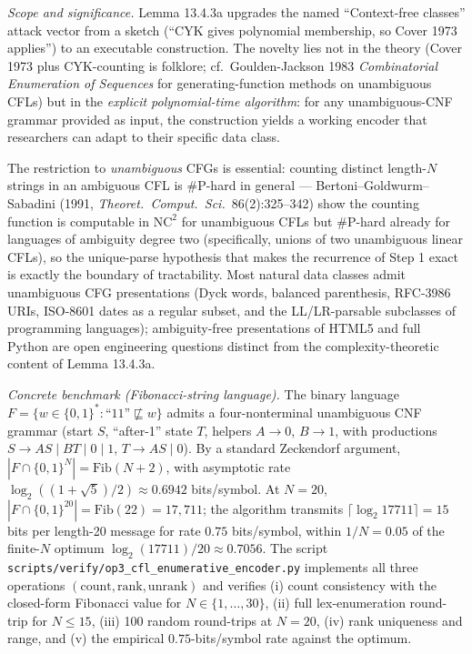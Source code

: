 \documentclass[
]{article}
\begin{document}
\emph{Scope and significance.} Lemma 13.4.3a upgrades the named
``Context-free classes'' attack vector from a sketch (``CYK gives
polynomial membership, so Cover 1973 applies'') to an executable
construction. The novelty lies not in the theory (Cover 1973 plus
CYK-counting is folklore; cf.\ Goulden-Jackson 1983 \emph{Combinatorial
Enumeration of Sequences} for generating-function methods on
unambiguous CFLs) but in the \emph{explicit polynomial-time algorithm}:
for any unambiguous-CNF grammar provided as input, the construction
yields a working encoder that researchers can adapt to their specific
data class.

The restriction to \emph{unambiguous} CFGs is essential: counting
distinct length-$N$ strings in an ambiguous CFL is \#P-hard in
general --- Bertoni--Goldwurm--Sabadini (1991, \emph{Theoret.\
Comput.\ Sci.}\ 86(2):325--342) show the counting function is
computable in $\mathrm{NC}^2$ for unambiguous CFLs but \#P-hard
already for languages of ambiguity degree two (specifically, unions
of two unambiguous linear CFLs), so the unique-parse hypothesis that
makes the recurrence of Step 1 exact is exactly the boundary of
tractability. Most natural data classes admit
unambiguous CFG presentations (Dyck words, balanced parenthesis,
RFC-3986 URIs, ISO-8601 dates as a regular subset, and the LL/LR-parsable
subclasses of programming languages); ambiguity-free presentations of
HTML5 and full Python are open engineering questions distinct from the
complexity-theoretic content of Lemma 13.4.3a.

\emph{Concrete benchmark (Fibonacci-string language).} The binary
language $F = \{w \in \{0,1\}^\ast : \text{``11''} \not\sqsubseteq w\}$
admits a four-nonterminal unambiguous CNF grammar (start $S$,
``after-1'' state $T$, helpers $A \to 0$, $B \to 1$, with productions
$S \to AS \mid BT \mid 0 \mid 1$, $T \to AS \mid 0$). By a standard
Zeckendorf argument, $|F \cap \{0,1\}^N| = \mathrm{Fib}(N+2)$, with
asymptotic rate $\log_2((1+\sqrt 5)/2) \approx 0.6942$ bits/symbol.
At $N = 20$, $|F \cap \{0,1\}^{20}| = \mathrm{Fib}(22) = 17{,}711$;
the algorithm transmits $\lceil \log_2 17711 \rceil = 15$ bits per
length-20 message for rate $0.75$ bits/symbol, within $1/N = 0.05$
of the finite-$N$ optimum $\log_2(17711)/20 \approx 0.7056$. The
script \texttt{scripts/verify/op3\_cfl\_enumerative\_encoder.py}
implements all three operations $(\mathrm{count}, \mathrm{rank},
\mathrm{unrank})$ and verifies (i) count consistency with the
closed-form Fibonacci value for $N \in \{1, \ldots, 30\}$, (ii) full
lex-enumeration round-trip for $N \leq 15$, (iii) 100 random
round-trips at $N = 20$, (iv) rank uniqueness and range, and (v) the
empirical $0.75$-bits/symbol rate against the optimum.
\end{document}
